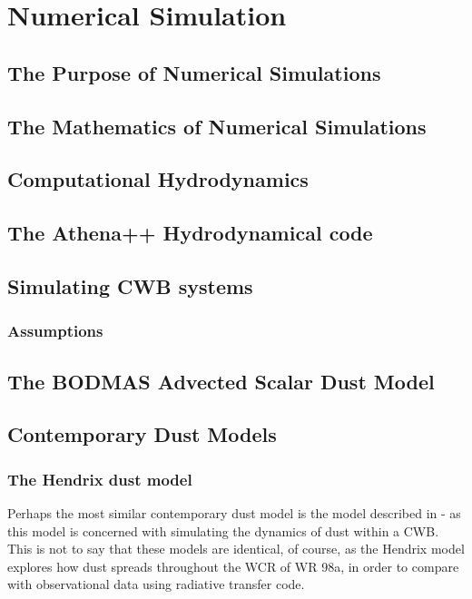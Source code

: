 \chapter{Numerical Simulation}
\label{ch:numsim}

\section{The Purpose of Numerical Simulations}
\label{sec:numerical-purpose}

\section{The Mathematics of Numerical Simulations}
\label{sec:numerical-math}

\section{Computational Hydrodynamics}

\label{sec:hydrodynamics}

\section{The Athena++ Hydrodynamical code}
\label{sec:athenapp}

\section{Simulating CWB systems}

\subsection{Assumptions}

\section{The BODMAS Advected Scalar Dust Model}
\label{sec:bodmas}

\section{Contemporary Dust Models}

\subsection{The Hendrix dust model}

Perhaps the most similar contemporary dust model is the model described in \cite{hendrix_pinwheels_2016} - as this model is concerned with simulating the dynamics of dust within a CWB.
This is not to say that these models are identical, of course, as the Hendrix model explores how dust spreads throughout the WCR of WR 98a, in order to compare with observational data using radiative transfer code. %

